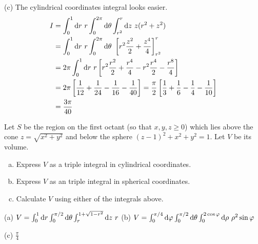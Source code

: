 \begin{solution}
(c) The cylindrical coordinates integral looks easier.
\begin{align*}
I &= \int_0^1 \dee{r}\ r \int_0^{2\pi}\dee{\theta} \int_{r^2}^r\dee{z}\
           z(r^2+z^2) \\
  &= \int_0^1 \dee{r}\ r \int_0^{2\pi}\dee{\theta}\ 
               \left[r^2\frac{z^2}{2}+\frac{z^4}{4}\right]_{r^2}^r \\
  &= 2\pi \int_0^1 \dee{r}\ r  
               \left[r^2\frac{r^2}{2}+\frac{r^4}{4}
               -r^2\frac{r^4}{2}-\frac{r^8}{4}\right] \\
  &=2\pi \left[\frac{1}{12}+\frac{1}{24}
               -\frac{1}{16}-\frac{1}{40}\right]
   =\frac{\pi}{2} \left[\frac{1}{3}+\frac{1}{6}
               -\frac{1}{4}-\frac{1}{10}\right] \\
   &=\frac{3\pi}{40}
\end{align*}
\end{solution}

\begin{question}[M200 2016D] %
Let $S$ be the region on the first octant (so that $x,y,z\ge 0$)
which lies above the cone $z=\sqrt{x^2+y^2}$ and below the sphere
$(z-1)^2 +x^2+y^2=1$. Let $V$ be its volume.
\begin{enumerate}[(a)]
\item
Express $V$ as a triple integral in cylindrical coordinates.
\item
Express $V$ as an triple integral in spherical coordinates.
\item
Calculate $V$ using either of the integrals above.
\end{enumerate}
\end{question}

%

\begin{answer}
(a) 
$V  = \int_0^1\mathrm{d}r \int_0^{\pi/2}\mathrm{d}\theta\int_r^{1+\sqrt{1-r^2}}\mathrm{d}z
     \ r$\qquad
(b)
$V = \int_0^{\pi/4}\dee{\varphi} \int_0^{\pi/2}\dee{\theta}
               \int_0^{2\cos\varphi}\dee{\rho}\ \rho^2\sin\varphi$

(c) $\frac{\pi}{4}$
\end{answer}

